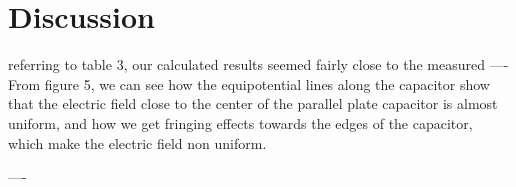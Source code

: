 \documentclass[letterpaper]{article}
\begin{document}
\section{Discussion}
referring to table 3, our calculated results seemed fairly close to the measured
----
From figure 5, we can see how the equipotential lines along the capacitor show that the
electric field close to the center of the parallel plate capacitor is almost uniform, and
how we get fringing effects towards the edges of the capacitor, which make the electric field non uniform.

----
%
\end{document}

